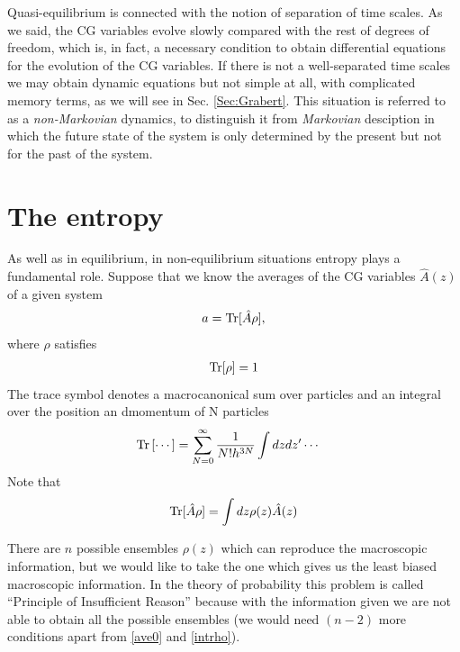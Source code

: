 \documentclass[b5paper,openright,11pt]{book}
\begin{document}
Quasi-equilibrium is connected with the notion of separation of time scales. 
As we said, the CG variables evolve slowly compared with the rest of degrees of freedom, which is, in fact, a necessary condition to obtain differential equations for the evolution of the CG variables. 
If there is not a well-separated time scales we may obtain dynamic equations but not simple at all, with complicated memory terms, as we will see in Sec. \ref{Sec:Grabert}. 
This situation is referred to as a {\it non-Markovian} dynamics, to distinguish it from {\it Markovian} desciption in which the future state of the system is only determined by the present but not for the past of the system. 

\section{The entropy}\label{Sec:TheEntropy}
As well as in equilibrium, in non-equilibrium situations entropy plays a fundamental role. 
Suppose that we know the averages of the CG variables $\hat{A}(z)$ of a given system 
\begin{align}
    a = {\rm Tr}[{\hat{A}}\rho] ,
    \label{ave0}
\end{align}
where $\rho$ satisfies
\begin{align}
    {\rm Tr}[\rho] = 1
    \label{intrho}
\end{align}
The trace symbol denotes a macrocanonical sum over particles and an integral over the position an dmomentum of N particles
\begin{align}
  {\rm Tr}\left[\cdots\right]&=\sum_{N=0}^\infty \frac{1}{N!h^{3N}}
\int dzdz'\cdots
\end{align}
Note that 
\begin{align}
    {\rm Tr}[\hat{A}\rho] = \int dz\rho(z)\hat{A}(z) 
\end{align}


There are $n$ possible ensembles $\rho(z)$ which can reproduce the macroscopic information, but we would like to take the one which gives us the least biased macroscopic information.
In the theory of probability this problem is called ``Principle of Insufficient Reason'' because with the information given we are not able to obtain all the possible ensembles (we would need $(n-2)$ more conditions apart from \ref{ave0} and \ref{intrho}).
\end{document}
